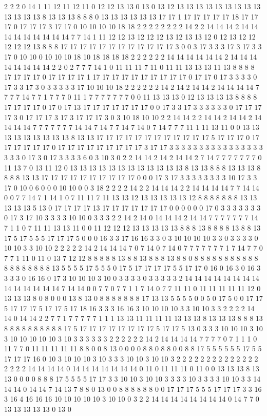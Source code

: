 2 2 2 0 14 1 11 12 11 12 11 0 12 12 13 13 0 13 0 13 12 13 13 13 13 13 13 13 13 13 13 13 13 13 8 13 13 13 8 8 8 0 13 13 13 13 13 13 17 17 1 17 17 17 17 17 18 17 17 17 0 17 17 17 3 17 17 0 10 10 10 10 18 18 2 2 2 2 2 2 2 2 14 2 2 14 14 14 2 14 14 14 14 14 14 14 14 14 7 7 14 1 11 12 12 13 12 12 12 13 12 13 13 12 0 12 13 12 12 12 12 12 13 8 8 8 17 17 17 17 17 17 17 17 17 17 17 17 3 0 0 3 17 3 3 3 17 3 17 3 3 17 0 10 10 0 10 10 10 18 10 18 18 18 18 2 2 2 2 2 2 14 14 14 14 14 14 2 14 14 14 14 14 14 14 14 2 2 0 2 7 7 7 14 1 0 11 11 11 7 11 0 11 11 13 13 13 11 13 8 8 8 8 17 17 17 17 0 17 17 17 17 1 17 17 17 17 17 17 17 17 17 17 0 17 17 0 17 3 3 3 3 0 17 3 3 17 3 0 3 3 3 3 3 17 10 10 10 18 2 2 2 2 2 2 14 2 14 2 14 14 2 14 14 14 14 7 7 7 7 14 7 7 1 7 7 7 0 11 1 7 7 7 7 7 7 7 0 0 11 13 13 13 0 12 13 13 13 13 8 8 8 8 17 17 17 17 0 17 0 17 13 17 17 17 17 17 17 17 0 0 17 3 3 17 3 3 3 3 3 3 0 17 17 17 17 3 0 17 17 17 3 17 3 17 17 17 3 0 3 10 18 10 10 2 2 14 14 2 2 14 14 2 14 14 2 14 14 14 14 7 7 7 7 7 7 7 14 14 7 14 7 7 14 7 14 0 7 14 7 7 7 11 1 11 13 11 0 0 13 13 13 13 13 13 13 13 13 8 13 13 17 17 17 17 17 17 17 17 17 17 17 17 5 17 17 17 0 17 17 17 17 17 17 0 17 17 17 17 17 17 17 17 17 3 17 17 3 3 3 3 3 3 3 3 3 3 3 3 3 3 3 3 3 3 3 0 17 3 0 17 3 3 3 3 6 0 3 10 3 0 2 2 14 14 2 14 2 14 14 2 7 14 7 7 7 7 7 7 7 0 11 13 7 0 13 11 12 0 13 13 13 13 13 13 13 13 13 13 13 13 8 13 13 8 8 8 13 13 13 8 8 8 8 13 13 17 17 17 17 17 17 17 17 17 17 0 0 0 17 3 17 3 3 3 3 3 3 3 3 10 17 3 3 17 0 10 0 6 0 0 0 10 10 0 0 3 18 2 2 2 2 14 2 2 14 14 14 2 2 14 14 14 14 7 7 14 14 0 0 7 7 14 7 1 14 1 0 7 11 11 7 11 13 13 12 13 13 13 13 13 12 8 8 8 8 8 8 8 13 13 13 13 13 5 13 0 17 17 17 17 13 17 17 17 17 17 17 17 0 0 0 0 0 0 17 0 3 3 3 3 3 3 3 0 17 3 17 10 3 3 3 3 10 10 0 3 3 3 2 2 14 2 14 0 14 14 14 2 14 14 7 7 7 7 7 7 7 14 7 1 1 0 7 11 11 13 13 11 0 0 11 12 12 12 13 13 13 13 13 8 8 8 13 8 8 8 8 13 8 8 13 17 5 17 5 5 5 17 17 17 5 0 0 0 16 3 3 17 16 16 3 3 0 3 10 10 10 10 3 3 0 3 3 3 3 0 10 10 3 3 10 10 2 2 2 2 2 14 2 14 14 14 7 0 7 14 0 7 14 0 7 7 7 7 7 7 7 1 7 14 7 7 0 7 7 1 11 0 11 0 13 7 12 12 8 8 8 8 8 13 8 8 13 8 8 8 13 8 8 0 8 8 8 8 8 8 8 8 8 8 8 8 8 8 8 8 8 8 8 13 5 5 5 5 17 5 5 5 0 17 5 17 17 17 17 5 5 17 17 0 16 0 16 3 0 16 3 3 3 3 0 16 16 0 17 3 10 10 10 3 10 0 3 3 3 3 0 3 3 3 3 3 2 14 14 14 14 14 14 14 14 14 14 14 14 14 14 7 14 14 0 0 7 7 0 7 7 1 1 7 14 0 7 7 11 11 0 11 11 11 11 11 12 0 13 13 13 8 0 8 0 0 0 13 8 13 0 8 8 8 8 8 8 8 17 13 13 5 5 5 5 0 0 5 0 17 5 0 0 17 17 5 17 17 17 5 17 17 5 17 18 16 3 3 3 16 16 3 10 10 10 10 3 3 10 10 3 3 2 2 2 2 14 14 0 14 14 2 2 7 7 1 7 7 7 7 7 1 1 1 13 13 11 11 11 11 13 13 13 8 13 13 13 8 8 8 13 8 8 8 8 8 8 8 8 8 8 17 5 17 17 17 17 17 17 17 17 5 17 17 5 13 0 3 3 3 10 10 10 3 10 3 10 10 10 10 10 3 10 3 3 3 3 3 3 2 2 2 2 2 2 14 2 14 14 14 14 7 7 7 7 0 7 1 1 1 0 11 7 7 0 11 11 11 11 11 8 8 0 0 8 13 0 0 0 0 8 8 0 8 8 0 0 8 8 17 5 5 5 5 5 5 17 5 5 17 17 17 16 0 10 3 10 10 10 3 10 3 3 3 10 10 3 10 10 3 2 2 2 2 2 2 2 2 2 2 2 2 2 2 2 2 2 2 14 14 14 14 0 14 14 14 14 14 14 14 0 11 0 11 11 11 0 11 0 0 13 13 13 8 13 13 0 0 0 0 8 8 8 17 5 5 5 5 17 17 3 3 10 10 3 10 10 3 3 3 3 10 3 3 3 3 10 10 3 3 14 14 14 0 14 14 7 14 13 7 8 8 0 13 0 0 8 8 8 8 8 8 0 0 17 17 17 5 5 5 17 17 17 3 3 16 3 16 4 16 16 16 10 10 10 10 10 3 10 10 0 3 2 2 14 14 14 14 14 14 14 14 0 14 7 7 0 13 13 13 13 13 0 13 0 